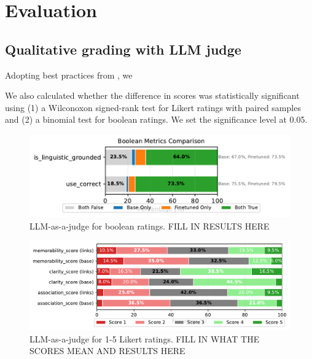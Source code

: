 \section{Evaluation} \label{sec:evaluation}

\subsection{Qualitative grading with LLM judge} \label{sec:qualitative-llm-judge}

Adopting best practices from \citet{guSurveyLLMasaJudge2025}, we

We also calculated whether the difference in scores was statistically significant using (1) a Wilconoxon signed-rank test for Likert ratings with paired samples and (2) a binomial test for boolean ratings. We set the significance level at 0.05.


\begin{figure}
  \centering
  \includegraphics[width=\linewidth]{figures/boolean_comparison.pdf}
  \caption{LLM-as-a-judge for boolean ratings. FILL IN RESULTS HERE}
  \label{fig:llm-judge-boolean}
\end{figure}

\begin{figure}
  \centering
  \includegraphics[width=\linewidth]{figures/likert_distribution.pdf}
  \caption{LLM-as-a-judge for 1-5 Likert ratings. FILL IN WHAT THE SCORES MEAN AND RESULTS HERE}
  \label{fig:llm-judge-likert}
\end{figure}

